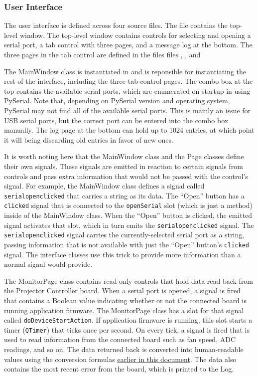 \documentclass{article}
\begin{document}
\subsubsection{User Interface} \label{sssec:SWUI}
The user interface is defined across four source files.  The  file
contains the top-level window.  The top-level window contains controls for selecting and opening a
serial port, a tab control with three pages, and a message log at the bottom.  The three pages in
the tab control are defined in the files files , , and

The MainWindow class is instantiated in  and is reponsible for instantiating the rest
of the interface, including the three tab control pages.  The combo box at the top contains the
available serial ports, which are enumerated on startup in  using PySerial.  Note
that, depending on PySerial version and operating system, PySerial may not find all of the available
serial ports.  This is mainly an issue for USB serial ports, but the correct port can be entered
into the combo box manually.  The log page at the bottom can hold up to 1024 entries, at which point
it will being discarding old entries in favor of new ones.

It is worth noting here that the MainWindow class and the Page classes define their own signals.
These signals are emitted in reaction to certain signals from controls and pass extra information
that would not be passed with the control's signal.  For example, the MainWindow class defines a
signal called \texttt{serialopenclicked} that carries a string as its data.  The ``Open'' button has
a \texttt{clicked} signal that is connected to the \texttt{openSerial} slot (which is just a method)
inside of the MainWindow class.  When the ``Open'' button is clicked, the emitted signal activates
that slot, which in turn emits the \texttt{serialopenclicked} signal.  The
\texttt{serialopenclicked} signal carries the currently-selected serial port as a string, passing
information that is not available with just the ``Open'' button's \texttt{clicked} signal.  The
interface classes use this trick to provide more information than a normal signal would provide.

The MonitorPage class contains read-only controls that hold data read back from the Projector
Controller board.  When a serial port is opened, a signal is fired that contains a Boolean value
indicating whether or not the connected board is running application firmware.  The MonitorPage class has
a slot for that signal called \texttt{doDeviceStartAction}.  If application firmware is running,
this slot starts a timer (\texttt{QTimer}) that ticks once per second.  On every tick, a signal is
fired that is used to read information from the connected board such as fan speed, ADC readings, and
so on.  The data returned back is converted into human-readable values using the conversion formulas
\hyperref[ssec:ConversionFormulas]{earlier in this document}.  The data also contains the most
recent error from the board, which is printed to the Log.
\end{document}
